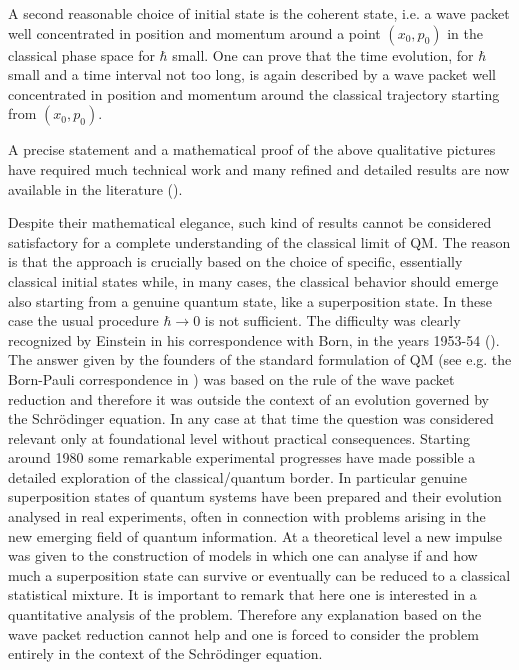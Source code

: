 \documentclass[12pt,reqno]{amsart}
\newcommand{\n}{\relax}
\numberwithin{equation}{section}
\begin{document}
\n 
A second reasonable choice of initial state is the coherent state, i.e.  a 
wave packet well concentrated in position and momentum around a point $(x_0,p_0)$ in the classical phase space for $\hbar $ small.  One can prove that the time evolution, for $\hbar $ small and a time interval not too long, is again described by a wave packet well concentrated in position and momentum around the classical trajectory starting from $(x_0,p_0)$.


\n
A precise statement and a  mathematical proof of the above qualitative pictures have required much technical work and  many refined and detailed results are now available in the literature (\cite{r}).

\n
Despite their mathematical elegance, such kind of results cannot be considered  satisfactory for a complete understanding of the classical limit of QM. The reason is that the approach is crucially based on the choice of specific, essentially classical initial states while, in many cases, the classical behavior should emerge also starting from a genuine quantum state, like a superposition state. In these case the usual procedure $\hbar \rightarrow 0$ is not sufficient.   The difficulty was clearly recognized by Einstein in his correspondence with Born, in the years 1953-54 (\cite{bo}). The answer given by the founders of the standard formulation of QM (see e.g. the Born-Pauli correspondence in \cite{bo}) was based on the rule of the wave packet reduction and therefore it was outside the context of an evolution governed by  the Schr\"{o}dinger equation. In any case at that time the question was  considered  relevant only at foundational level  without  practical consequences. Starting around 1980 some remarkable experimental progresses have made possible a detailed  exploration of the classical/quantum border. In particular genuine superposition states of quantum systems have been prepared and their evolution analysed in real  experiments, often in connection with problems arising in  the 
new emerging field of quantum information. At a theoretical level a new impulse was given to the construction of  models in which one can   analyse if and how much a superposition state can survive or eventually  can be reduced to a classical statistical mixture. It is important to remark that here one is interested in  a quantitative analysis of the problem. Therefore  any explanation based on the  wave packet reduction cannot help and  one is forced to consider the problem entirely in the context of the Schr\"{o}dinger equation.
\end{document}
